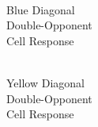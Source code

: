 \documentclass[journal,onecolumn]{IEEEtran}
\begin{document}
\begin{figure}[H]
\begin{subfigure}{0.15\textwidth}
        \caption{\\ Blue Diagonal\\ Double-Opponent\\ Cell Response}
    \end{subfigure}
    \begin{subfigure}{0.15\textwidth}
        \centering
        \captionsetup{justification=centering}
        \caption{\\ Yellow Diagonal\\ Double-Opponent\\ Cell Response}
    \end{subfigure}%
    \par \bigskip%
    \begin{subfigure}{0.15\textwidth}
        \centering
        \captionsetup{justification=centering}

\end{subfigure}
\end{figure}
\end{document}
